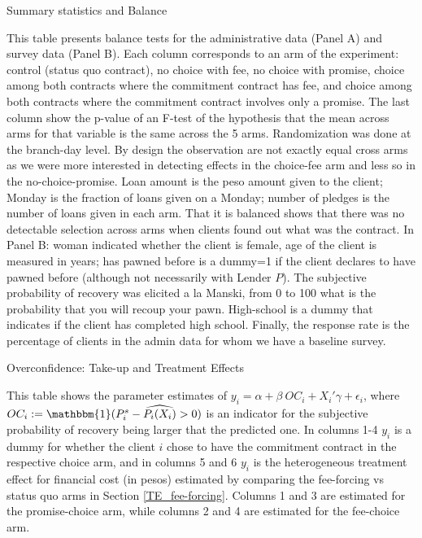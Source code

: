 \documentclass[11pt]{article}
\begin{document}
\begin{table}[H]
\caption{Summary statistics and Balance}
\label{SS}
\begin{center}
\scriptsize{}
\end{center}
 \scriptsize
This table presents balance tests for the administrative data (Panel A) and survey data (Panel B). Each column corresponds to an arm of the experiment: control (status quo contract), no choice with fee, no choice with promise, choice among both contracts where the commitment contract has fee, and choice among both contracts where the commitment contract involves only a promise. The last column show the p-value of an F-test of the hypothesis that the mean across arms for that variable is the same across the 5 arms. Randomization was done at the branch-day level. By design the observation are not exactly equal cross arms as we were more interested in detecting effects in the choice-fee arm and less so in the no-choice-promise. Loan amount is the peso amount given to the client; Monday is the fraction of loans given on a Monday; number of pledges is the number of loans given in each arm. That it is balanced shows that there was no detectable selection across arms when clients found out what was the contract. In Panel B: woman indicated whether the client is female, age of the client is measured in years; has pawned before is a dummy=1 if the client declares to have pawned before (although not necessarily with Lender $P$). The subjective probability of recovery was elicited a la Manski, from 0 to 100 what is the probability that you will recoup your pawn. High-school is a dummy that indicates if the client has completed high school. Finally, the response rate is the percentage of clients in the admin data for whom we have a baseline survey.
\end{table}


\pagebreak



\begin{table}[H]
\caption{Overconfidence: Take-up and Treatment Effects}
\label{oc_reg}
\begin{center}
\scriptsize{}
\end{center}
 \footnotesize This table shows the parameter estimates of $y_i = \alpha + \beta \: OC_i + X_i'\gamma + \epsilon_i$, where $OC_i:=\mathbbm{1}(P^s_i-\widehat{P_i(X_i)}>0)$ is an indicator for the subjective probability of recovery being larger that the predicted one. In columns 1-4 $y_i$ is a dummy for whether the client $i$ chose to have the commitment contract in the respective choice arm, and in columns 5 and 6 $y_i$ is the heterogeneous treatment effect for financial cost (in pesos) estimated by comparing the fee-forcing vs status quo arms in Section \ref{TE_fee-forcing}. Columns 1 and 3 are estimated for the promise-choice arm, while columns 2 and 4 are estimated for the fee-choice arm. 
\end{table}
\end{document}
